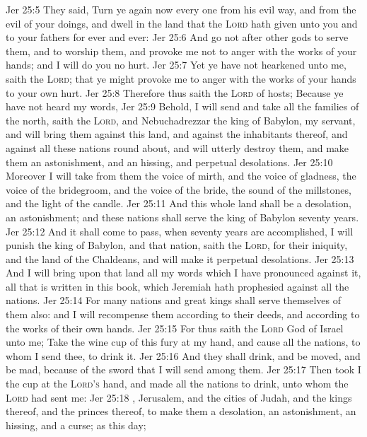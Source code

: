 \vs Jer 25:5 They said, Turn ye again now every one from his evil way, and from the evil of your doings, and dwell in the land that the \textsc{Lord} hath given unto you and to your fathers for ever and ever:
\vs Jer 25:6 And go not after other gods to serve them, and to worship them, and provoke me not to anger with the works of your hands; and I will do you no hurt.
\vs Jer 25:7 Yet ye have not hearkened unto me, saith the \textsc{Lord}; that ye might provoke me to anger with the works of your hands to your own hurt.
\vs Jer 25:8 Therefore thus saith the \textsc{Lord} of hosts; Because ye have not heard my words,
\vs Jer 25:9 Behold, I will send and take all the families of the north, saith the \textsc{Lord}, and Nebuchadrezzar the king of Babylon, my servant, and will bring them against this land, and against the inhabitants thereof, and against all these nations round about, and will utterly destroy them, and make them an astonishment, and an hissing, and perpetual desolations.
\vs Jer 25:10 Moreover I will take from them the voice of mirth, and the voice of gladness, the voice of the bridegroom, and the voice of the bride, the sound of the millstones, and the light of the candle.
\vs Jer 25:11 And this whole land shall be a desolation,  an astonishment; and these nations shall serve the king of Babylon seventy years.
\vs Jer 25:12 And it shall come to pass, when seventy years are accomplished,  I will punish the king of Babylon, and that nation, saith the \textsc{Lord}, for their iniquity, and the land of the Chaldeans, and will make it perpetual desolations.
\vs Jer 25:13 And I will bring upon that land all my words which I have pronounced against it,  all that is written in this book, which Jeremiah hath prophesied against all the nations.
\vs Jer 25:14 For many nations and great kings shall serve themselves of them also: and I will recompense them according to their deeds, and according to the works of their own hands.
\vs Jer 25:15 For thus saith the \textsc{Lord} God of Israel unto me; Take the wine cup of this fury at my hand, and cause all the nations, to whom I send thee, to drink it.
\vs Jer 25:16 And they shall drink, and be moved, and be mad, because of the sword that I will send among them.
\vs Jer 25:17 Then took I the cup at the \textsc{Lord's} hand, and made all the nations to drink, unto whom the \textsc{Lord} had sent me:
\vs Jer 25:18 , Jerusalem, and the cities of Judah, and the kings thereof, and the princes thereof, to make them a desolation, an astonishment, an hissing, and a curse; as  this day;
